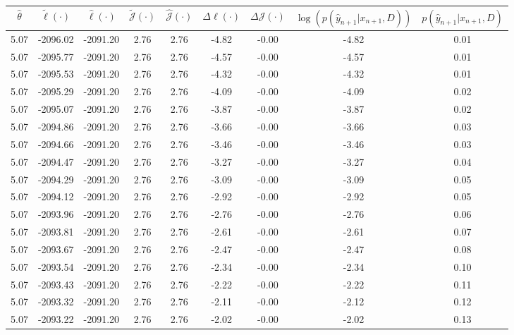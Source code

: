 \begin{table}[htbp]
        \centering
        \tiny
        \begin{adjustbox}{angle=90}
            \begin{tabular}{|c|c|c|c|c|c|c|c|c|}
                \hline
                 $\hat{\theta}$ & $\tilde{\ell}(\cdot)$ & $\hat{\ell}(\cdot)$ & $\tilde{\mathcal{J}}(\cdot)$ & $\hat{\mathcal{J}}(\cdot)$ & $\Delta \ell(\cdot)$ & $\Delta \mathcal{J}(\cdot)$ & $\log(p(\hat{y}_{n+1}|x_{n+1}, D))$ & $p(\hat{y}_{n+1}|x_{n+1}, D)$ \\
                \hline
                 5.07 & -2096.02 & -2091.20 & 2.76 & 2.76 & -4.82 & -0.00 & -4.82 & 0.01\\ \hline
 5.07 & -2095.77 & -2091.20 & 2.76 & 2.76 & -4.57 & -0.00 & -4.57 & 0.01\\ \hline
 5.07 & -2095.53 & -2091.20 & 2.76 & 2.76 & -4.32 & -0.00 & -4.32 & 0.01\\ \hline
 5.07 & -2095.29 & -2091.20 & 2.76 & 2.76 & -4.09 & -0.00 & -4.09 & 0.02\\ \hline
 5.07 & -2095.07 & -2091.20 & 2.76 & 2.76 & -3.87 & -0.00 & -3.87 & 0.02\\ \hline
 5.07 & -2094.86 & -2091.20 & 2.76 & 2.76 & -3.66 & -0.00 & -3.66 & 0.03\\ \hline
 5.07 & -2094.66 & -2091.20 & 2.76 & 2.76 & -3.46 & -0.00 & -3.46 & 0.03\\ \hline
 5.07 & -2094.47 & -2091.20 & 2.76 & 2.76 & -3.27 & -0.00 & -3.27 & 0.04\\ \hline
 5.07 & -2094.29 & -2091.20 & 2.76 & 2.76 & -3.09 & -0.00 & -3.09 & 0.05\\ \hline
 5.07 & -2094.12 & -2091.20 & 2.76 & 2.76 & -2.92 & -0.00 & -2.92 & 0.05\\ \hline
 5.07 & -2093.96 & -2091.20 & 2.76 & 2.76 & -2.76 & -0.00 & -2.76 & 0.06\\ \hline
 5.07 & -2093.81 & -2091.20 & 2.76 & 2.76 & -2.61 & -0.00 & -2.61 & 0.07\\ \hline
 5.07 & -2093.67 & -2091.20 & 2.76 & 2.76 & -2.47 & -0.00 & -2.47 & 0.08\\ \hline
 5.07 & -2093.54 & -2091.20 & 2.76 & 2.76 & -2.34 & -0.00 & -2.34 & 0.10\\ \hline
 5.07 & -2093.43 & -2091.20 & 2.76 & 2.76 & -2.22 & -0.00 & -2.22 & 0.11\\ \hline
 5.07 & -2093.32 & -2091.20 & 2.76 & 2.76 & -2.11 & -0.00 & -2.12 & 0.12\\ \hline
 5.07 & -2093.22 & -2091.20 & 2.76 & 2.76 & -2.02 & -0.00 & -2.02 & 0.13\\ \hline

\end{tabular}
\end{adjustbox}
\end{table}
